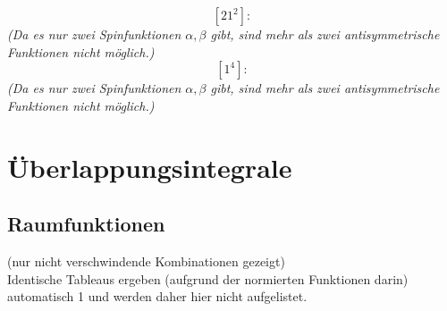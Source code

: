 \documentclass[fleqn]{article}%
\begin{document}
\vspace{0.25cm}%
\vspace{0.25cm}%
\vspace{0.25cm}%
\begin{dmath*}\left[21^2\right]:\end{dmath*}%
\vspace{0.25cm}%
\textit{(Da es nur zwei Spinfunktionen $\alpha, \beta$ gibt, sind mehr als zwei antisymmetrische Funktionen nicht möglich.)}%
\vspace{0.25cm}%
\vspace{0.25cm}%
\begin{dmath*}\left[1^4\right]:\end{dmath*}%
\vspace{0.25cm}%
\textit{(Da es nur zwei Spinfunktionen $\alpha, \beta$ gibt, sind mehr als zwei antisymmetrische Funktionen nicht möglich.)}%
\vspace{0.25cm}%
\newpage%
\section{Überlappungsintegrale}%
\label{sec:berlappungsintegrale}%

%
\subsection{Raumfunktionen}%
\label{subsec:Raumfunktionen}%
 (nur nicht verschwindende Kombinationen gezeigt)\\Identische Tableaus ergeben (aufgrund der normierten Funktionen darin) automatisch 1 und werden daher hier nicht aufgelistet.
\end{document}

